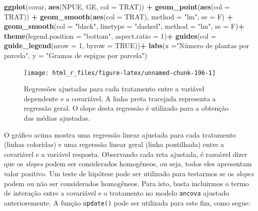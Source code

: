 \documentclass[
]{book}
\newenvironment{Shaded}{\begin{snugshade}}{\end{snugshade}}
\newcommand{\DataTypeTok}[1]{\textcolor[rgb]{0.13,0.29,0.53}{#1}}
\newcommand{\DecValTok}[1]{\textcolor[rgb]{0.00,0.00,0.81}{#1}}
\newcommand{\KeywordTok}[1]{\textcolor[rgb]{0.13,0.29,0.53}{\textbf{#1}}}
\newcommand{\NormalTok}[1]{#1}
\newcommand{\OperatorTok}[1]{\textcolor[rgb]{0.81,0.36,0.00}{\textbf{#1}}}
\newcommand{\OtherTok}[1]{\textcolor[rgb]{0.56,0.35,0.01}{#1}}
\newcommand{\StringTok}[1]{\textcolor[rgb]{0.31,0.60,0.02}{#1}}
\numberwithin{equation}{section}
\begin{document}
\begin{Shaded}
\begin{Highlighting}[]
\KeywordTok{ggplot}\NormalTok{(covar, }\KeywordTok{aes}\NormalTok{(NPUE, GE, }\DataTypeTok{col =}\NormalTok{ TRAT)) }\OperatorTok{+}
\StringTok{  }\KeywordTok{geom\_point}\NormalTok{(}\KeywordTok{aes}\NormalTok{(}\DataTypeTok{col =}\NormalTok{ TRAT)) }\OperatorTok{+}
\StringTok{  }\KeywordTok{geom\_smooth}\NormalTok{(}\KeywordTok{aes}\NormalTok{(}\DataTypeTok{col =}\NormalTok{ TRAT), }\DataTypeTok{method =} \StringTok{"lm"}\NormalTok{, }\DataTypeTok{se =}\NormalTok{ F) }\OperatorTok{+}
\StringTok{  }\KeywordTok{geom\_smooth}\NormalTok{(}\DataTypeTok{col =} \StringTok{"black"}\NormalTok{, }\DataTypeTok{linetype =} \StringTok{"dashed"}\NormalTok{, }\DataTypeTok{method =} \StringTok{"lm"}\NormalTok{, }\DataTypeTok{se =}\NormalTok{ F)}\OperatorTok{+}
\StringTok{  }\KeywordTok{theme}\NormalTok{(}\DataTypeTok{legend.position =} \StringTok{"bottom"}\NormalTok{,}
        \DataTypeTok{aspect.ratio =} \DecValTok{1}\NormalTok{)}\OperatorTok{+}
\StringTok{  }\KeywordTok{guides}\NormalTok{(}\DataTypeTok{col =} \KeywordTok{guide\_legend}\NormalTok{(}\DataTypeTok{nrow =} \DecValTok{1}\NormalTok{, }\DataTypeTok{byrow =} \OtherTok{TRUE}\NormalTok{))}\OperatorTok{+}
\StringTok{  }\KeywordTok{labs}\NormalTok{(}\DataTypeTok{x =}\StringTok{"Número de plantas por parcela"}\NormalTok{,}
       \DataTypeTok{y =} \StringTok{"Gramas de espigas por parcela"}\NormalTok{)}
\end{Highlighting}
\end{Shaded}

\begin{figure}

{\centering \texttt{[image: html\_r\_files/figure-latex/unnamed-chunk-196-1]} 

}

\caption{Regressões ajustadas para cada tratamento entre a variável dependente e a covariável. A linha preta tracejada representa a regressão geral. O slope desta regressão é utilizado para a obtenção das médias ajustadas.}\label{fig:unnamed-chunk-196}
\end{figure}

O gráfico acima mostra uma regressão linear ajustada para cada tratamento (linhas coloridas) e uma regerssão linear geral (linha pontilhada) entre a covariável e a variável resposta. Observando cada reta ajustada, é razoável dizer que os \emph{slopes} podem ser considerados homogêneos, ou seja, todos eles apresentam valor positivo. Um teste de hipótese pode ser utilizado para testarmos se os \emph{slopes} podem ou não ser considerados homogêneos. Para isto, basta incluirmos o termo de interação entre a covariável e o tratamento no modelo \texttt{ancova} ajustado anterioremente. A função \texttt{update()} pode ser utilizada para este fim, como segue:
\end{document}

